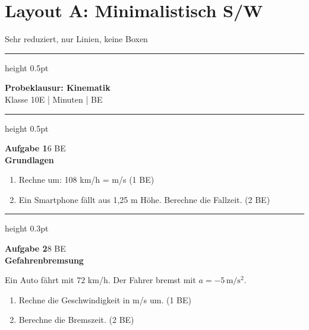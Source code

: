 \documentclass[11pt,a4paper]{article}
\begin{document}
\section*{Layout A: Minimalistisch S/W}
\vspace{-0.3cm}
{\small Sehr reduziert, nur Linien, keine Boxen}

\vspace{0.5cm}
\hrule height 0.5pt
\vspace{0.3cm}

\begin{center}
{\Large\bfseries Probeklausur: Kinematik}\\[0.2cm]
{\small Klasse 10E \quad| Minuten \quad| BE}
\end{center}

\vspace{0.2cm}
\hrule height 0.5pt
\vspace{0.5cm}

{\bfseries Aufgabe 1}\hfill{\small 6 BE}\\[0.2cm]
\textbf{Grundlagen}

\begin{enumerate}
\item[a)] Rechne um: 108 km/h = \underline{\hspace{2cm}} m/s \hfill (1 BE)
\item[b)] Ein Smartphone fällt aus 1,25 m Höhe. Berechne die Fallzeit. \hfill (2 BE)
\end{enumerate}

\vspace{0.5cm}
\hrule height 0.3pt
\vspace{0.5cm}

{\bfseries Aufgabe 2}\hfill{\small 8 BE}\\[0.2cm]
\textbf{Gefahrenbremsung}

Ein Auto fährt mit 72 km/h. Der Fahrer bremst mit $a = -5\,\mathrm{m/s^2}$.

\begin{enumerate}
\item[a)] Rechne die Geschwindigkeit in m/s um. \hfill (1 BE)
\item[b)] Berechne die Bremszeit. \hfill (2 BE)
\end{enumerate}

\vspace{1cm}
\end{document}
